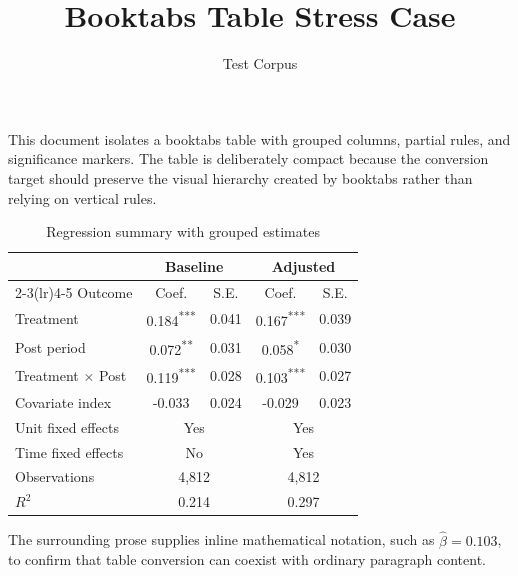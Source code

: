 \documentclass[11pt]{article}
\title{Booktabs Table Stress Case}
\author{Test Corpus}
\date{}
\newcommand{\sym}[1]{\textsuperscript{#1}}
\begin{document}
\maketitle

This document isolates a booktabs table with grouped columns, partial rules, and
significance markers. The table is deliberately compact because the conversion
target should preserve the visual hierarchy created by booktabs rather than
relying on vertical rules.

\begin{table}[htbp]
\centering
\caption{Regression summary with grouped estimates}
\label{tab:booktabs}
\begin{tabular}{lcccc}
\toprule
& \multicolumn{2}{c}{Baseline} & \multicolumn{2}{c}{Adjusted} \\
\cmidrule(lr){2-3}\cmidrule(lr){4-5}
Outcome & Coef. & S.E. & Coef. & S.E. \\
\midrule
Treatment & 0.184\sym{***} & 0.041 & 0.167\sym{***} & 0.039 \\
Post period & 0.072\sym{**} & 0.031 & 0.058\sym{*} & 0.030 \\
Treatment $\times$ Post & 0.119\sym{***} & 0.028 & 0.103\sym{***} & 0.027 \\
Covariate index & -0.033 & 0.024 & -0.029 & 0.023 \\
\midrule
Unit fixed effects & \multicolumn{2}{c}{Yes} & \multicolumn{2}{c}{Yes} \\
Time fixed effects & \multicolumn{2}{c}{No} & \multicolumn{2}{c}{Yes} \\
Observations & \multicolumn{2}{c}{4,812} & \multicolumn{2}{c}{4,812} \\
$R^{2}$ & \multicolumn{2}{c}{0.214} & \multicolumn{2}{c}{0.297} \\
\bottomrule
\end{tabular}
\end{table}

The surrounding prose supplies inline mathematical notation, such as
$\widehat{\beta}=0.103$, to confirm that table conversion can coexist with
ordinary paragraph content.
\end{document}
